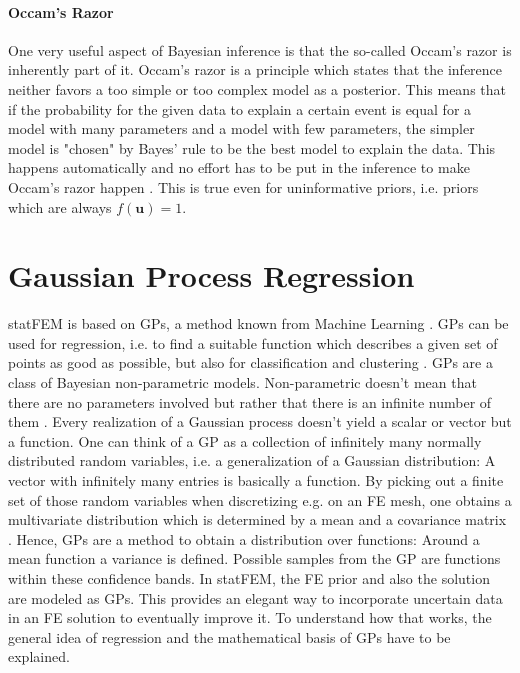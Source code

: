 \documentclass[%
  a4paper,oneside,%
  11pt,%
  smallchapters,
  style=printdev,
  extramargin,
  green,%
  rgb, <cmyk>
  ]{tubsbook}
\begin{document}
\paragraph{Occam's Razor}

One very useful aspect of Bayesian inference is that the so-called Occam's razor is inherently part of it. Occam's razor is a principle which states that the inference neither favors a too simple or too complex model as a posterior. This means that if the probability for the given data to explain a certain event is equal for a model with many parameters and a model with few parameters, the simpler model is "chosen" by Bayes' rule to be the best model to explain the data. This happens automatically and no effort has to be put in the inference to make Occam's razor happen \cite{Tipping2004, MacKay1991}. This is true even for uninformative priors, i.e. priors which are always $f(\bm{u})=1$.

\section{Gaussian Process Regression}
statFEM is based on GPs, a method known from Machine Learning \cite{murphy2012}. GPs can be used for regression, i.e. to find a suitable function which describes a given set of points as good as possible, but also for classification and clustering \cite{gortler2019} . 
GPs are a class of Bayesian non-parametric models. Non-parametric doesn't mean that there are no parameters involved but rather that there is an infinite number of them \cite{gortler2019}. Every realization of a Gaussian process doesn't yield a scalar or vector but a function. One can think of a GP as a collection of infinitely many normally distributed random variables, i.e. a generalization of a Gaussian distribution: A vector with infinitely many entries is basically a function. By picking out a finite set of those random variables when discretizing e.g. on an FE mesh, one obtains a multivariate distribution which is determined by a mean and a covariance matrix \cite[p. 2]{rasmussen2006}. Hence, GPs are a method to obtain a distribution over functions: Around a mean function a variance is defined. Possible samples from the GP are functions within these confidence bands. In statFEM, the FE prior and also the solution are modeled as GPs. This provides an elegant way to incorporate uncertain data in an FE solution to eventually improve it. To understand how that works, the general idea of regression and the mathematical basis of GPs have to be explained.
\end{document}
